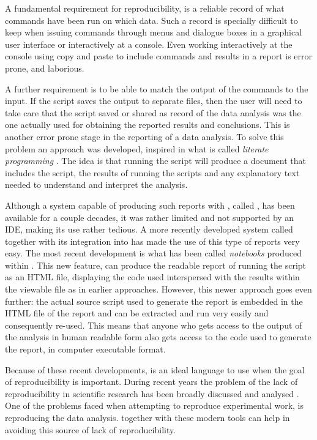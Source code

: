\documentclass[krantz2]{krantz}\usepackage{knitr}%
\begin{document}
A fundamental requirement for reproducibility, is a reliable record of what commands have been run on which data. Such a record is specially difficult to keep when issuing commands through menus and dialogue boxes in a graphical user interface or interactively at a console. Even working interactively at the \Rpgrm console using copy and paste to include commands and results in a report is error prone, and laborious.

A further requirement is to be able to match the output of the \Rlang commands to the input. If the script saves the output to separate files, then the user will need to take care that the script saved or shared as record of the data analysis was the one actually used for obtaining the reported results and conclusions. This is another error prone stage in the reporting of a data analysis. To solve this problem an approach was developed, inspired in what is called \emph{literate programming} \autocite{Knuth1984a}. The idea is that running the script will produce a document that includes the script, the results of running the scripts and any explanatory text needed to understand and interpret the analysis.

Although a system capable of producing such reports with \Rlang, called  \autocite{Leisch2002}, has been available for a couple decades, it was rather limited and not supported by an IDE, making its use rather tedious. A more recently developed system called  \autocite{Xie2013} together with its integration into \RStudio has made the use of this type of reports very easy. The most recent development is what has been called \Rlang \emph{notebooks} produced within \RStudio. This new feature, can produce the readable report of running the script as an HTML file, displaying the code used interspersed with the results within the viewable file as in earlier approaches. However, this newer approach goes even further: the actual source script used to generate the report is embedded in the HTML file of the report and can be extracted and run very easily and consequently re-used. This means that anyone who gets access to the output of the analysis in human readable form also gets access to the code used to generate the report, in computer executable format.

Because of these recent developments, \Rlang is an ideal language to use when the goal of reproducibility is important. During recent years the problem of the lack of reproducibility in scientific research has been broadly discussed and analysed \autocite{Gandrud2015}. One of the problems faced when attempting to reproduce experimental work, is reproducing the data analysis. \Rlang together with these modern tools can help in avoiding this source of lack of reproducibility.
\end{document}
